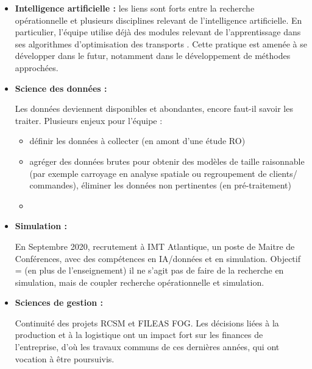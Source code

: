 	\begin{itemize}
	    \item \textbf{Intelligence artificielle :} les liens sont forts entre la recherche opérationnelle et plusieurs disciplines relevant de l'intelligence artificielle. 
	    En particulier, l'équipe utilise déjà des modules relevant de l'apprentissage dans ses algorithmes d'optimisation des transports . 
	    Cette pratique est amenée à se développer dans le futur, notamment dans le développement de méthodes approchées. 
	    
	    
	    \item \textbf{Science des données : }
	    
	    Les données deviennent disponibles et abondantes, encore faut-il savoir les traiter. Plusieurs enjeux pour l'équipe \slp : 
	    \begin{itemize}
	        \item définir les données à collecter (en amont d'une étude RO)
	        \item agréger des données brutes pour obtenir des modèles de taille raisonnable (par exemple carroyage en analyse spatiale ou regroupement de clients/ commandes), éliminer les données non pertinentes (en pré-traitement)
	        \item {}
	    \end{itemize}
	    
	    \item \textbf{Simulation : }
	    
	    En Septembre 2020, recrutement à IMT Atlantique, un poste de Maitre de Conférences, avec des compétences en IA/données et en simulation. 
	    Objectif = (en plus de l'enseignement) il ne s'agit pas de faire de la recherche en simulation, mais de coupler recherche opérationnelle et simulation.
	    
	    
	    \item \textbf{Sciences de gestion : }
	    
	    
	    Continuité des projets RCSM et FILEAS FOG. Les décisions liées à la production et à la logistique ont un impact fort sur les finances de l'entreprise, d'où les travaux communs de ces dernières années, qui ont vocation à être poursuivis. 
	    

\end{itemize}
